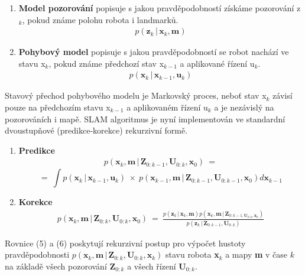 \documentclass[12pt,a4paper]{article}
\begin{document}
\begin{enumerate}
\item \textbf{Model pozorování} popisuje s jakou pravděpodobností získáme pozorování z$_k$, pokud známe polohu robota i landmarků.
\begin{eqnarray}
p(\textbf{z}_k \,|\, \textbf{x}_k, \textbf{m})
\end{eqnarray}
\item \textbf{Pohybový model} popisuje s jakou pravděpodobností se robot nachází ve stavu x$_k$, pokud známe předchozí stav x$_{k-1}$ a aplikované řízení u$_k$.
\begin{eqnarray}
p(\textbf{x}_k \,|\, \textbf{x}_{k-1}, \textbf{u}_k)
\end{eqnarray}
\end{enumerate}

Stavový přechod pohybového modelu je Markovský proces, neboť stav x$_k$ závisí pouze na předchozím stavu x$_{k-1}$ a aplikovaném řízení u$_k$ a je nezávislý na pozorováních i mapě. SLAM algoritmus je nyní implementován ve standardní dvoustupňové (predikce-korekce) rekurzivní formě.

\newpage



\begin{enumerate}
\item \textbf{Predikce} 
\begin{eqnarray}
p(\textbf{x}_k, \textbf{m} \,|\, \textbf{Z}_{0:k-1}, \textbf{U}_{0:k}, \textbf{x}_0) \: = 
\end{eqnarray}
$$
= \: \int p(\textbf{x}_k \,|\, \textbf{x}_{k-1}, \textbf{u}_k) \: \times \: p(\textbf{x}_{k-1}, \textbf{m} \,|\, \textbf{Z}_{0:k-1}, \textbf{U}_{0:k-1}, \textbf{x}_0) d\textbf{x}_{k-1}  
$$
\item \textbf{Korekce}
\begin{eqnarray}
p(\textbf{x}_k, \textbf{m} \,|\, \textbf{Z}_{0:k}, \textbf{U}_{0:k}, \textbf{x}_0) \: = \: \frac{p(\textbf{z}_k \,|\, \textbf{x}_k, \textbf{m}) p(\textbf{x}_k, \textbf{m} \,|\, \textbf{Z}_{0:k-1, \textbf{U}_{0:k}, \textbf{x}_0})}{p(\textbf{z}_k \,|\, \textbf{Z}_{0:k-1}, \textbf{U}_{0:k})}
\end{eqnarray}
\end{enumerate}

Rovnice (5) a (6) poskytují rekurzivní postup pro výpočet hustoty pravděpodobnosti $p(\textbf{x}_k, \textbf{m} \,|\, \textbf{Z}_{0:k}, \textbf{U}_{0:k}, \textbf{x}_k)$ stavu robota \textbf{x}$_k$ a mapy \textbf{m} v čase $k$ na základě všech pozorování \textbf{Z}$_{0:k}$ a všech řízení \textbf{U}$_{0:k}$.
\end{document}

